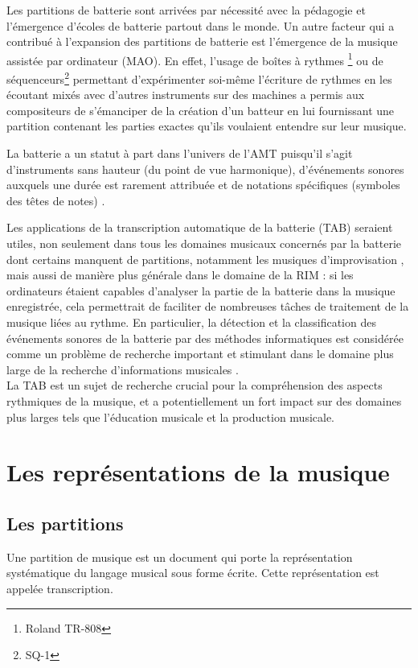 Les partitions de batterie sont arrivées par nécessité avec la pédagogie et
l’émergence d’écoles de batterie partout dans le monde. 
Un autre facteur qui a contribué à l’expansion des partitions de batterie est
l’émergence de la musique assistée par ordinateur (MAO). En effet, l’usage de
boîtes à rythmes \footnote{Roland TR-808} ou de séquenceurs\footnote{SQ-1}
permettant d’expérimenter soi-même l’écriture de rythmes en les écoutant mixés
avec d’autres instruments sur des machines a permis aux compositeurs de
s’émanciper de la création d’un batteur en lui fournissant une partition
contenant les parties exactes qu’ils voulaient entendre sur leur musique.

La batterie a un statut à part dans l’univers de l’AMT puisqu’il s’agit
d’instruments sans hauteur (du point de vue harmonique), d’événements sonores
auxquels une durée est rarement attribuée et de notations spécifiques (symboles
des têtes de notes) \cite{Review_ADT}.

Les applications de la transcription automatique de la batterie (TAB) seraient
utiles, non seulement dans tous les domaines musicaux concernés par la batterie
dont certains manquent de partitions, notamment les musiques d’improvisation
\cite{future_directions}, mais aussi de manière plus générale dans le domaine
de la RIM : si les ordinateurs étaient capables d’analyser la partie de la
batterie dans la musique enregistrée, cela permettrait de faciliter de
nombreuses tâches de traitement de la musique liées au rythme. En particulier,
la détection et la classification des événements sonores de la batterie par des
méthodes informatiques est considérée comme un problème de recherche important
et stimulant dans le domaine plus large de la recherche d’informations
musicales \cite{Review_ADT}.\\
La TAB est un sujet de recherche crucial pour la compréhension des aspects
rythmiques de la musique, et a potentiellement un fort impact sur des domaines
plus larges tels que l’éducation musicale et la production musicale.

\section{Les représentations de la musique}
\subsection*{Les partitions}
Une partition de musique est un document qui porte la représentation
systématique du langage musical sous forme écrite. Cette représentation est
appelée transcription.

